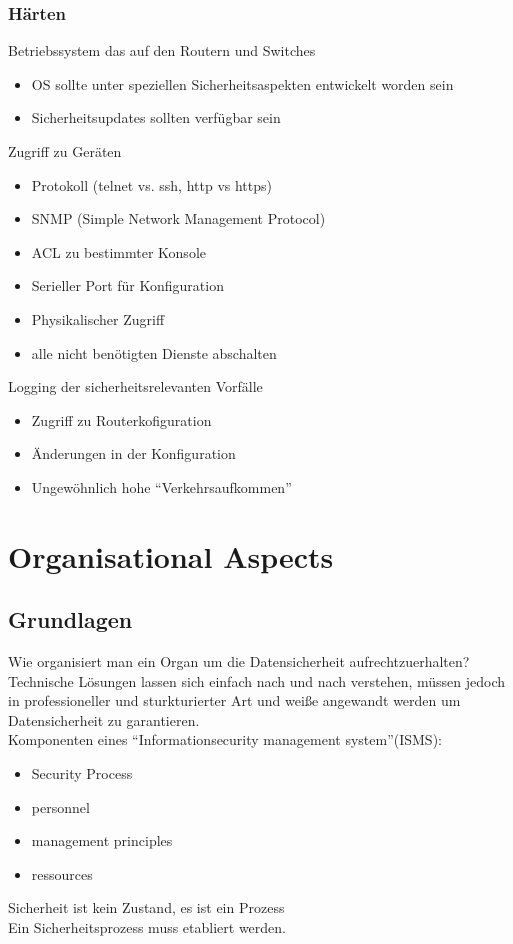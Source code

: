 \documentclass{article} %
\begin{document}
\subsubsection{Härten}
Betriebssystem das auf den Routern und Switches
\begin{itemize}
	\item OS sollte unter speziellen Sicherheitsaspekten entwickelt worden sein
    \item Sicherheitsupdates sollten verfügbar sein
\end{itemize}
Zugriff zu Geräten
\begin{itemize}
	\item Protokoll (telnet vs. ssh, http vs https)
    \item SNMP (Simple Network Management Protocol)
    \item ACL zu bestimmter Konsole
    \item Serieller Port für Konfiguration
    \item Physikalischer Zugriff
    \item alle nicht benötigten Dienste abschalten
\end{itemize}
Logging der sicherheitsrelevanten Vorfälle
\begin{itemize}
	\item Zugriff zu Routerkofiguration
    \item Änderungen in der Konfiguration
    \item Ungewöhnlich hohe "`Verkehrsaufkommen"'
\end{itemize}
\section{Organisational Aspects}
\subsection{Grundlagen}
Wie organisiert man ein Organ um die Datensicherheit aufrechtzuerhalten?\\
Technische Lösungen lassen sich einfach nach und nach verstehen, müssen jedoch in professioneller und sturkturierter Art und weiße angewandt werden um Datensicherheit zu garantieren.\\
Komponenten eines "`Informationsecurity management system"'(ISMS):
\begin{itemize}
	\item Security Process
    \item personnel
    \item management principles
    \item ressources
\end{itemize}
Sicherheit ist kein Zustand, es ist ein Prozess\\
Ein Sicherheitsprozess muss etabliert werden.
\end{document}
